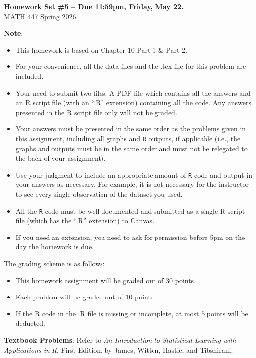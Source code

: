 \documentclass[12pt]{article}
\begin{document}
\newcommand{\bm}[1]{\mbox{\boldmath$#1$}}

\begin{center}{\bf Homework Set \#5 -- Due 11:59pm, Friday, May 22.} \\ {\sc MATH 447 Spring 2026}\end{center}
\textbf{Note}: 
\begin{itemize}
\item This homework is based on Chapter 10 Part 1 \& Part 2. 
\item For your convenience, all the data files and the .tex file for this problem are included.
\item Your need to submit two files: A PDF file which contains all the answers and an R script file (with an ``.R'' extension) containing all the code.  Any answers presented in the R script file only will not be graded.
\item Your answers must be presented in the same order as the problems given in this assignment, including all graphs and {\tt R} outputs, if applicable (i.e., the graphs and outputs must be in the same order and must not be relegated to the back of your assignment). 
\item Use your judgment to include an appropriate amount of {\tt R} code and output in your answers as necessary. For example, it is not necessary for the instructor to see every single observation of the dataset you used.
\item All the {\tt R} code must be well documented and submitted as a single R script file (which has the ``.R'' extension) to Canvas. 
\item If you need an extension, you need to ask for permission before 5pm on the day the homework is due.
\end{itemize}

The grading scheme is as follows:
\begin{itemize}
\item This homework assignment will be graded out of $30$ points.
\item Each problem will be graded out of $10$ points.
\item If the R code in the .R file is missing or incomplete, at most $5$ points will be deducted.
\end{itemize}

\textbf{Textbook Problems}: Refer to \textit{An Introduction to Statistical Learning with Applications in R}, First Edition, by James, Witten, Hastie, and Tibshirani.
\end{document}
